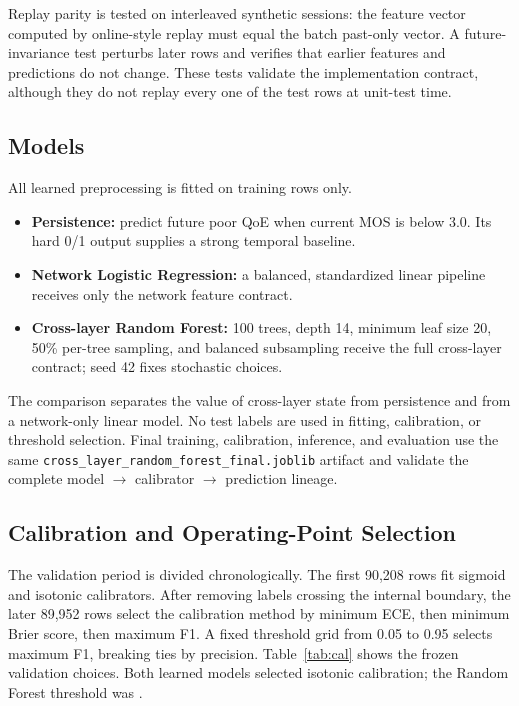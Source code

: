 \documentclass[10pt,conference]{IEEEtran}
\begin{document}
Replay parity is tested on interleaved synthetic sessions: the feature vector
computed by online-style replay must equal the batch past-only vector.  A
future-invariance test perturbs later rows and verifies that earlier features
and predictions do not change.  These tests validate the implementation
contract, although they do not replay every one of the \TestRows test rows at
unit-test time.

\subsection{Models}

All learned preprocessing is fitted on training rows only.

\begin{itemize}
\item \textbf{Persistence:} predict future poor QoE when current MOS is below
      3.0.  Its hard 0/1 output supplies a strong temporal baseline.
\item \textbf{Network Logistic Regression:} a balanced, standardized linear
      pipeline receives only the network feature contract.
\item \textbf{Cross-layer Random Forest:} 100 trees, depth 14,
      minimum leaf size 20, 50\% per-tree sampling, and balanced subsampling
      receive the full cross-layer contract; seed 42 fixes stochastic choices.
\end{itemize}

The comparison separates the value of cross-layer state from persistence and
from a network-only linear model.  No test labels are used in fitting,
calibration, or threshold selection.  Final training, calibration, inference,
and evaluation use the same
\texttt{cross\_layer\_random\_forest\_final.joblib} artifact and validate the
complete model $\rightarrow$ calibrator $\rightarrow$ prediction lineage.

\subsection{Calibration and Operating-Point Selection}

The validation period is divided chronologically.  The first 90,208 rows fit
sigmoid and isotonic calibrators.  After removing labels crossing the internal
boundary, the later 89,952 rows select the calibration method by minimum ECE,
then minimum Brier score, then maximum F1.  A fixed threshold grid from 0.05 to
0.95 selects maximum F1, breaking ties by precision.  Table~\ref{tab:cal}
shows the frozen validation choices.  Both learned models selected isotonic
calibration; the Random Forest threshold was \DecisionThreshold.
\end{document}
